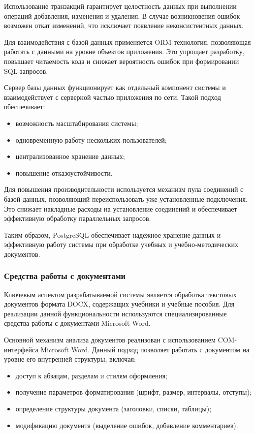 Использование транзакций гарантирует целостность данных при выполнении операций добавления, изменения и удаления. В случае возникновения ошибок возможен откат изменений, что исключает появление неконсистентных данных.

Для взаимодействия с базой данных применяется ORM-технология, позволяющая работать с данными на уровне объектов приложения. Это упрощает разработку, повышает читаемость кода и снижает вероятность ошибок при формировании SQL-запросов.

Сервер базы данных функционирует как отдельный компонент системы и взаимодействует с серверной частью приложения по сети. Такой подход обеспечивает:
\begin{itemize}
	\item возможность масштабирования системы;
	\item одновременную работу нескольких пользователей;
	\item централизованное хранение данных;
	\item повышение отказоустойчивости.
\end{itemize}

Для повышения производительности используется механизм пула соединений с базой данных, позволяющий переиспользовать уже установленные подключения. Это снижает накладные расходы на установление соединений и обеспечивает эффективную обработку параллельных запросов.

Таким образом, PostgreSQL обеспечивает надёжное хранение данных и эффективную работу системы при обработке учебных и учебно-методических документов.

\subsubsection{Средства работы с документами}

Ключевым аспектом разрабатываемой системы является обработка текстовых документов формата DOCX, содержащих учебники и учебные пособия. Для реализации данной функциональности используются специализированные средства работы с документами Microsoft Word.

Основной механизм анализа документов реализован с использованием COM-интерфейса Microsoft Word. Данный подход позволяет работать с документом на уровне его внутренней структуры, включая:
\begin{itemize}
	\item доступ к абзацам, разделам и стилям оформления;
	\item получение параметров форматирования (шрифт, размер, интервалы, отступы);
	\item определение структуры документа (заголовки, списки, таблицы);
	\item модификацию документа (выделение ошибок, добавление комментариев).
\end{itemize}

